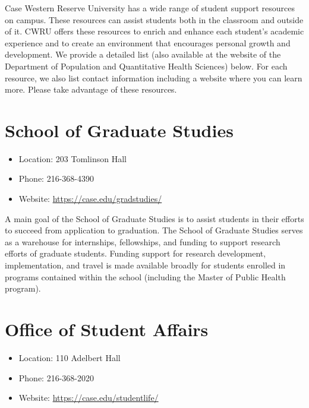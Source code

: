 \documentclass[
]{book}
\providecommand{\tightlist}{%
  \setlength{\itemsep}{0pt}\setlength{\parskip}{0pt}}
\begin{document}
Case Western Reserve University has a wide range of student support resources on campus. These resources can assist students both in the classroom and outside of it. CWRU offers these resources to enrich and enhance each student's academic experience and to create an environment that encourages personal growth and development. We provide a detailed list (also available at the website of the Department of Population and Quantitative Health Sciences) below. For each resource, we also list contact information including a website where you can learn more. Please take advantage of these resources.

\hypertarget{school-of-graduate-studies}{%
\section{School of Graduate Studies}\label{school-of-graduate-studies}}

\begin{itemize}
\tightlist
\item
  Location: 203 Tomlinson Hall
\item
  Phone: 216-368-4390
\item
  Website: \url{https://case.edu/gradstudies/}
\end{itemize}

A main goal of the School of Graduate Studies is to assist students in their efforts to succeed from application to graduation. The School of Graduate Studies serves as a warehouse for internships, fellowships, and funding to support research efforts of graduate students. Funding support for research development, implementation, and travel is made available broadly for students enrolled in programs contained within the school (including the Master of Public Health program).

\hypertarget{office-of-student-affairs}{%
\section{Office of Student Affairs}\label{office-of-student-affairs}}

\begin{itemize}
\tightlist
\item
  Location: 110 Adelbert Hall
\item
  Phone: 216-368-2020
\item
  Website: \url{https://case.edu/studentlife/}
\end{itemize}
\end{document}
